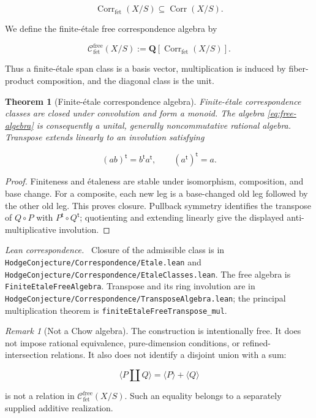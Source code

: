 \documentclass[11pt]{article}
\newtheorem{theorem}{Theorem}[section]
\theoremstyle{definition}
\theoremstyle{remark}
\newtheorem*{remark}{Remark}
\DeclareMathOperator{\Corr}{Corr}
\newcommand{\Q}{\mathbf Q}
\newcommand{\fe}{\mathrm{f\acute et}}
\newcommand{\leanpath}[1]{\texttt{\nolinkurl{#1}}}
\newcommand{\corrsrc}[1]{%
  \leanpath{HodgeConjecture/Correspondence/#1}}
\newenvironment{leanfiles}
  {\par\medskip\begingroup\footnotesize\raggedright\noindent
   \textit{Lean correspondence.}\ }
  {\par\endgroup\medskip}
\begin{document}
\[
  \Corr_{\fe}(X/S)
  \subseteq \Corr(X/S).
\]

We define the finite-\'etale free correspondence algebra by

\begin{equation}
\label{eq:free-algebra}
  \mathcal C_{\fe}^{\mathrm{free}}(X/S)
  :=\Q[\Corr_{\fe}(X/S)].
\end{equation}

Thus a finite-\'etale span class is a basis vector, multiplication is induced
by fiber-product composition, and the diagonal class is the unit.

\begin{theorem}[Finite-\'etale correspondence algebra]
\label{thm:finite-etale-algebra}
Finite-\'etale correspondence classes are closed under convolution and form
a monoid.  The algebra \eqref{eq:free-algebra} is consequently a unital,
generally noncommutative rational algebra.  Transpose extends linearly to an
involution satisfying

\[
  (ab)^{\mathsf t}=b^{\mathsf t}a^{\mathsf t},
  \qquad
  (a^{\mathsf t})^{\mathsf t}=a.
\]
\end{theorem}

\begin{proof}
Finiteness and \'etaleness are stable under isomorphism, composition, and
base change.  For a composite, each new leg is a base-changed old leg
followed by the other old leg.  This proves closure.  Pullback symmetry
identifies the transpose of \(Q\circ P\) with
\(P^{\mathsf t}\circ Q^{\mathsf t}\); quotienting and extending linearly give
the displayed anti-multiplicative involution.
\end{proof}

\begin{leanfiles}
Closure of the admissible class is in \corrsrc{Etale.lean} and
\corrsrc{EtaleClasses.lean}.  The free algebra is
\leanpath{FiniteEtaleFreeAlgebra}.  Transpose and its ring involution are in
\corrsrc{TransposeAlgebra.lean}; the principal multiplication theorem is
\leanpath{finiteEtaleFreeTranspose_mul}.
\end{leanfiles}

\begin{remark}[Not a Chow algebra]
The construction is intentionally free.  It does not impose rational
equivalence, pure-dimension conditions, or refined-intersection relations.
It also does not identify a disjoint union with a sum:

\[
  \langle P\amalg Q\rangle
  =\langle P\rangle+\langle Q\rangle
\]

is not a relation in
\(\mathcal C_{\fe}^{\mathrm{free}}(X/S)\).  Such an equality belongs to a
separately supplied additive realization.
\end{remark}
\end{document}
